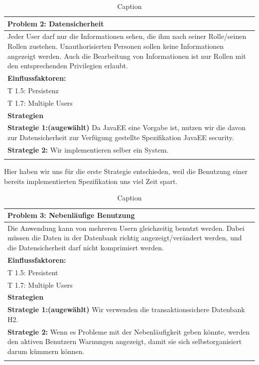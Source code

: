 \documentclass[enabledeprecatedfontcommands,fontsize=12pt,paper=a4,twoside]{scrartcl}
\begin{document}
\begin{table}[]
    \centering
    \begin{tabular}{|p{15cm}|}
    \hline
          \textbf{Problem 2:} Datensicherheit \\ \hline
          Jeder User darf nur die Informationen sehen, die ihm nach seiner Rolle/seinen Rollen zustehen. Unauthorisierten Personen sollen keine Informationen angezeigt werden. Auch die Bearbeitung von Informationen ist nur Rollen mit den entsprechenden Privilegien erlaubt. \\ \hline
          \textbf{Einflussfaktoren: } \\
          T 1.5: Persistenz \\
          T 1.7: Multiple Users\\
          \hline
          \textbf{Strategien} \\ \hline
          \textbf{Strategie 1:(augewählt)} Da JavaEE eine Vorgabe ist, nutzen wir die davon zur Datensicherheit zur Verfügung gestellte Spezifikation JavaEE security.\\
          \textbf{Strategie 2:} Wir implementieren selber ein System. \\
          \\ \hline
    \end{tabular}

    \caption{Caption}
    \label{tab:my_label}
\end{table}
Hier haben wir uns für die erste Strategie entschieden, weil die Benutzung einer bereits implementierten Spezifikation uns viel Zeit spart. \\

\begin{table}[H]
    \centering
    \begin{tabular}{|p{15cm}|}
    \hline
          \textbf{Problem 3:} Nebenläufige Benutzung  \\ \hline %
          Die Anwendung kann von mehreren Usern gleichzeitig benutzt werden. Dabei müssen die Daten in der Datenbank richtig angezeigt/verändert werden, und die Datensicherheit darf nicht komprimiert werden. \\ \hline
          \textbf{Einflussfaktoren: } \\
          T 1.5: Persistent \\
          T 1.7: Multiple Users\\
          \hline
          \textbf{Strategien} \\ \hline
          \textbf{Strategie 1:(augewählt)} Wir verwenden die transaktionssichere Datenbank H2. \\
          \textbf{Strategie 2:} Wenn es Probleme mit der Nebenläufigkeit geben könnte, werden den aktiven Benutzern Warnungen angezeigt, damit sie sich selbstorganisiert darum kümmern können. \\
          \\ \hline
    \end{tabular}

    \caption{Caption}
    \label{tab:my_label}
\end{table}
\end{document}
